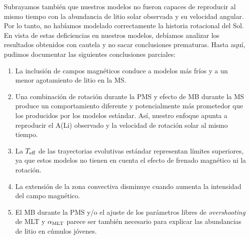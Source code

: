 Subrayamos también que nuestros modelos no fueron capaces de reproducir al mismo tiempo con la abundancia de litio solar observada y su velocidad angular. Por lo tanto, no habíamos modelado correctamente la historia rotacional del Sol. En vista de estas deficiencias en nuestros modelos, debíamos analizar los resultados obtenidos con cautela y no sacar conclusiones prematuras. Hasta aquí, pudimos documentar las siguientes conclusiones parciales:
\begin{enumerate}
	\item La inclusión de campos magnéticos conduce a modelos más fríos y a un menor agotamiento de litio en la MS.
	\item Una combinación de rotación durante la PMS y efecto de MB durante la MS produce un comportamiento diferente y potencialmente más prometedor que los producidos por los modelos estándar. Así, nuestro enfoque apunta a reproducir el A(Li) observado y la velocidad de rotación solar al mismo tiempo.
	\item La $T_{\mathrm{eff}}$ de las trayectorias evolutivas estándar representan límites superiores, ya que estos modelos no tienen en cuenta el efecto de frenado magnético ni la rotación.
	\item La extensión de la zona convectiva disminuye cuando aumenta la intensidad del campo magnético.
	\item El MB durante la PMS y/o el ajuste de los parámetros libres de \textit{overshooting} de MLT y $\alpha_{\mathrm{MLT}}$ parece ser también necesario para explicar las abundancias de litio en cúmulos jóvenes.
\end{enumerate}

\endinput
